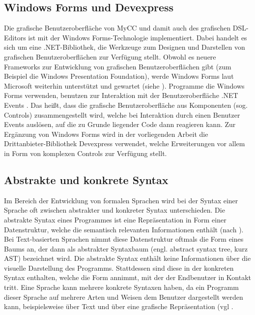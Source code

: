 \subsection{Windows Forms und Devexpress}
Die grafische Benutzeroberfläche von MyCC und damit auch des grafischen DSL-Editors ist mit der Windows Forms-Technologie implementiert. Dabei handelt es sich um eine .NET-Bibliothek, die Werkzeuge zum Designen und Darstellen von grafischen Benutzeroberflächen zur Verfügung stellt. Obwohl es neuere Frameworks zur Entwicklung von grafischen Benutzeroberflächen gibt (zum Beispiel die Windows Presentation Foundation), werde Windows Forms laut Microsoft weiterhin unterstützt und gewartet (siehe \cite{Allen:14}). Programme die Windows Forms verwenden, benutzen zur Interaktion mit der Benutzeroberfläche .NET Events \cite[S. 171ff]{Platt:03}. Das heißt, dass die grafische Benutzeroberfläche aus Komponenten (sog. Controls) zusammengestellt wird, welche bei Interaktion durch einen Benutzer Events auslösen, auf die zu Grunde liegender Code dann reagieren kann. Zur Ergänzung von Windows Forms wird in der vorliegenden Arbeit die Drittanbieter-Bibliothek Devexpress verwendet, welche Erweiterungen vor allem in Form von komplexen Controls zur Verfügung stellt. 

\subsection{Abstrakte und konkrete Syntax}
Im Bereich der Entwicklung von formalen Sprachen wird bei der Syntax einer Sprache oft zwischen abstrakter und konkreter Syntax unterschieden. Die abstrakte Syntax eines Programmes ist eine Repräsentation in Form einer Datenstruktur, welche die semantisch relevanten Informationen enthält (nach \cite[S. 26]{Voelter:13}). Bei Text-basierten Sprachen nimmt diese Datenstruktur oftmals die Form eines Baums an, der dann als abstrakter Syntaxbaum (engl. abstract syntax tree, kurz AST) bezeichnet wird. Die abstrakte Syntax enthält keine Informationen über die visuelle Darstellung des Programms. Stattdessen sind diese in der konkreten Syntax enthalten, welche die Form annimmt, mit der der Endbenutzer in Kontakt tritt. Eine Sprache kann mehrere konkrete Syntaxen haben, da ein Programm dieser Sprache auf mehrere Arten und Weisen dem Benutzer dargestellt werden kann, beispielsweise über Text und über eine grafische Repräsentation (vgl \cite[S. 6f]{Kleppe:09}.